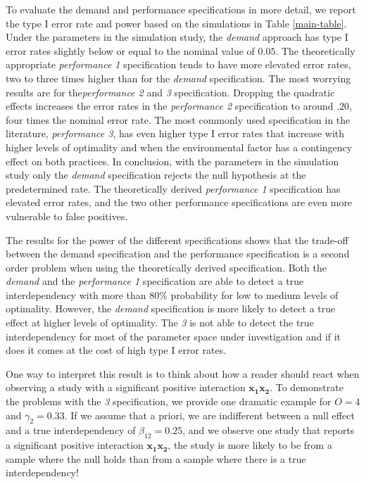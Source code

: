 \documentclass[12pt]{article}
\begin{document}
To evaluate the demand and performance specifications in more detail, we report the type I error rate and power based on the simulations in Table \ref{main-table}. Under the parameters in the simulation study, the \emph{demand} approach has type I error rates slightly below or equal to the nominal value of \(0.05\). The theoretically appropriate \emph{performance 1} specification tends to have more elevated error rates, two to three times higher than for the \emph{demand} specification. The most worrying results are for the\emph{performance 2} and \emph{3} specification. Dropping the quadratic effects increases the error rates in the \emph{performance 2} specification to around \(.20\), four times the nominal error rate. The most commonly used specification in the literature, \emph{performance 3}, has even higher type I error rates that increase with higher levels of optimality and when the environmental factor has a contingency effect on both practices. In conclusion, with the parameters in the simulation study only the \emph{demand} specification rejects the null hypothesis at the predetermined rate. The theoretically derived \emph{performance 1} specification has elevated error rates, and the two other performance specifications are even more vulnerable to false positives.

The results for the power of the different specifications shows that the trade-off between the demand specification and the performance specification is a second order problem when using the theoretically derived specification. Both the \emph{demand} and the \emph{performance 1} specification are able to detect a true interdependency with more than $80\%$ probability for low to medium levels of optimality. However, the \emph{demand} specification is more likely to detect a true effect at higher levels of optimality. The \emph{3} is not able to detect the true interdependency for most of the parameter space under investigation and if it does it comes at the cost of high type I error rates.

One way to interpret this result is to think about how a reader should react when observing a study with a significant positive interaction \(\mathbf{x_1 x_2}\). To demonstrate the problems with the \emph{3} specification, we provide one dramatic example for \(O = 4\) and \(\gamma_2 = 0.33\). If we assume that a priori, we are indifferent between a null effect and a true interdependency of \(\beta_{12} = 0.25\), and we observe one study that reports a significant positive interaction \(\mathbf{x_{1} x_{2}}\), the study is more likely to be from a sample where the null holds than from a sample where there is a true interdependency!
\end{document}
